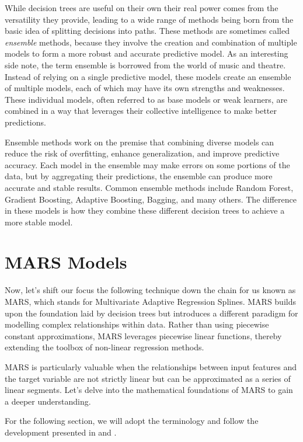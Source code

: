 While decision trees are useful on their own their real power comes from the versatility they provide, leading to a wide range of methods being born from the basic idea of splitting decisions into paths. These methods are sometimes called \textit{ensemble} methods, because they involve the creation and combination of multiple models to form a more robust and accurate predictive model. As an interesting side note, the term ensemble is borrowed from the world of music and theatre. Instead of relying on a single predictive model, these models create an ensemble of multiple models, each of which may have its own strengths and weaknesses. These individual models, often referred to as base models or weak learners, are combined in a way that leverages their collective intelligence to make better predictions.

Ensemble methods work on the premise that combining diverse models can reduce the risk of overfitting, enhance generalization, and improve predictive accuracy. Each model in the ensemble may make errors on some portions of the data, but by aggregating their predictions, the ensemble can produce more accurate and stable results. Common ensemble methods include Random Forest, Gradient Boosting, Adaptive Boosting, Bagging, and many others. The difference in these models is how they combine these different decision trees to achieve a more stable model. 

\section{MARS Models}

Now, let's shift our focus the following technique down the chain for us known as MARS, which stands for Multivariate Adaptive Regression Splines. MARS builds upon the foundation laid by decision trees but introduces a different paradigm for modelling complex relationships within data. Rather than using piecewise constant approximations, MARS leverages piecewise linear functions, thereby extending the toolbox of non-linear regression methods.

MARS is particularly valuable when the relationships between input features and the target variable are not strictly linear but can be approximated as a series of linear segments. Let's delve into the mathematical foundations of MARS to gain a deeper understanding.

For the following section, we will adopt the terminology and follow the development presented in \cite{Friedman_1991} and \cite{friedman1991multivariate}.


